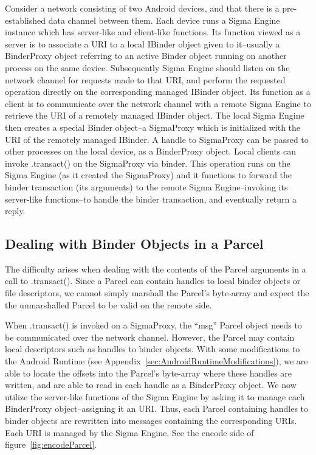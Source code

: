 \documentclass[prodmode]{acmlarge}
\begin{document}

Consider a network consisting of two Android devices, and that there is a pre-established data channel between them. Each device runs a Sigma Engine instance which has server-like and client-like functions. Its function viewed as a server is to associate a URI to a local IBinder object given to it--usually a BinderProxy object referring to an active Binder object running on another process on the same device. Subsequently Sigma Engine should listen on the network channel for requests made to that URI, and perform the requested operation directly on the corresponding managed IBinder object. Its function as a client is to communicate over the network channel with a remote Sigma Engine to retrieve the URI of a remotely managed IBinder object. The local Sigma Engine then creates a special Binder object--a SigmaProxy which is initialized with the URI of the remotely managed IBinder. A handle to SigmaProxy can be passed to other processes on the local device, as a BinderProxy object. Local clients can invoke .transact() on the SigmaProxy via binder. This operation runs on the Sigma Engine (as it created the SigmaProxy) and it functions to forward the binder transaction (its arguments) to the remote Sigma Engine--invoking its server-like functions--to handle the binder transaction, and eventually return a reply.

\subsection{Dealing with Binder Objects in a Parcel}
The difficulty arises when dealing with the contents of the Parcel arguments in a call to .transact(). Since a Parcel can contain handles to local binder objects or file descriptors, we cannot simply marshall the Parcel's byte-array and expect the the unmarshalled Parcel to be valid on the remote side.

When .transact() is invoked on a SigmaProxy, the ``msg'' Parcel object needs to be communicated over the network channel. However, the Parcel may contain local descriptors such as handles to binder objects. With some modifications to the Android Runtime (see Appendix~\ref{sec:AndroidRuntimeModifications}), we are able to locate the offsets into the Parcel's byte-array where these handles are written, and are able to read in each handle as a BinderProxy object. We now utilize the server-like functions of the Sigma Engine by asking it to manage each BinderProxy object--assigning it an URI. Thus, each Parcel containing handles to binder objects are rewritten into messages containing the corresponding URIs. Each URI is managed by the Sigma Engine. See the encode side of figure~\ref{fig:encodeParcel}.
\end{document}

